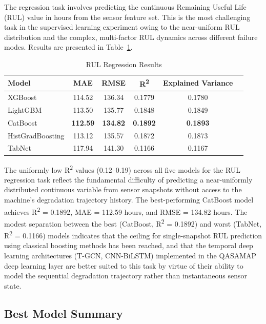 The regression task involves predicting the continuous Remaining Useful Life (RUL) value in hours from the sensor feature set. This is the most challenging task in the supervised learning experiment owing to the near-uniform RUL distribution and the complex, multi-factor RUL dynamics across different failure modes. Results are presented in Table~\ref{tab:rul_reg}.
\begin{table}[!htbp]
\centering
\caption{RUL Regression Results}
\label{tab:rul_reg}
\begin{tabular}{lccccc}
\hline
\textbf{Model} & \textbf{MAE} & \textbf{RMSE} & \textbf{R\textsuperscript{2}} & \textbf{Explained Variance} \\
\hline
XGBoost              & 114.52 & 136.34 & 0.1779 & 0.1780 \\
LightGBM             & 113.50 & 135.77 & 0.1848 & 0.1849 \\
CatBoost             & \textbf{112.59} & \textbf{134.82} & \textbf{0.1892} & \textbf{0.1893} \\
HistGradBoosting     & 113.12 & 135.57 & 0.1872 & 0.1873 \\
TabNet               & 117.94 & 141.30 & 0.1166 & 0.1167 \\
\hline
\end{tabular}
\end{table}
The uniformly low R\textsuperscript{2} values (0.12--0.19) across all five models for the RUL regression task reflect the fundamental difficulty of predicting a near-uniformly distributed continuous variable from sensor snapshots without access to the machine's degradation trajectory history. The best-performing CatBoost model achieves R\textsuperscript{2} = 0.1892, MAE = 112.59 hours, and RMSE = 134.82 hours. The modest separation between the best (CatBoost, R\textsuperscript{2} = 0.1892) and worst (TabNet, R\textsuperscript{2} = 0.1166) models indicates that the ceiling for single-snapshot RUL prediction using classical boosting methods has been reached, and that the temporal deep learning architectures (T-GCN, CNN-BiLSTM) implemented in the QASAMAP deep learning layer are better suited to this task by virtue of their ability to model the sequential degradation trajectory rather than instantaneous sensor state.

\subsection{Best Model Summary}

